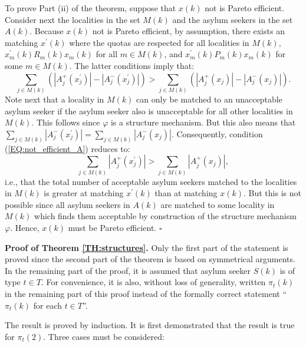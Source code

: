 \documentclass[12pt,fleqn]{article}
\begin{document}
To prove Part (ii) of the theorem, suppose that $x(k)$ not is Pareto efficient. Consider next the localities in the set $M(k)$ and the asylum seekers in the set $A(k)$. Because $x(k)$ not is Pareto efficient, by assumption, there exists an matching $x^\prime(k)$ where the quotas are respected for all localities in $M(k)$, $x_m^\prime(k)R_m(k) x_m(k)$ for all $m\in M(k)$, and $x_m^\prime(k)P_m(k) x_m(k)$ for some $m\in M(k)$. The latter conditions imply that:
\begin{equation}
\sum_{j\in M(k)}\left(|A_j^+(x_j^\prime)|-|A_j^-(x_j^\prime)|\right)>\sum_{j\in M(k)}\left(|A_j^+({x_j})|-|A_j^-({x_j})|\right).\label{EQ:not_efficient_A}
\end{equation}
\noindent Note next that a locality in $M(k)$ can only be matched to an unacceptable asylum seeker if the asylum seeker also is unacceptable for all other localities in $M(k)$. This follows since $\varphi$ is a structure mechanism. But this also means that $\sum_{j\in M(k)}|A_j^-(x_j^\prime)|=\sum_{j\in M(k)}|A_j^-({x_j})|$. Consequently, condition (\ref{EQ:not_efficient_A}) reduces to:
\begin{equation}
\sum_{j\in M(k)}|A_j^+(x_j^\prime)|>\sum_{j\in M(k)}|A_j^+({x_j})|,\label{EQ:not_efficient_B}
\end{equation}
\noindent i.e., that the total number of acceptable asylum seekers matched to the localities in $M(k)$ is greater at matching $x^\prime(k)$ than at matching $x(k)$. But this is not possible since all asylum seekers in $A(k)$ are matched to some locality in $M(k)$ which finds them acceptable by construction of the structure mechanism $\varphi$. Hence, $x(k)$ must be Pareto efficient. \hfill $\square$

\medskip

\noindent\textbf{Proof of Theorem \ref{TH:structures}.} Only the first part of the statement is proved since the second part of the theorem is based on symmetrical arguments. In the remaining part of the proof, it is assumed that asylum seeker $S(k)$ is of type $t\in T$. For convenience, it is also, without loss of generality, written $\pi_t(k)$ in the remaining part of this proof instead of the formally correct statement ``$\pi_t(k)$ for each $t\in T$''.

The result is proved by induction. It is first demonstrated that the result is true for $\pi_t(2)$. Three cases must be considered:
\end{document}
